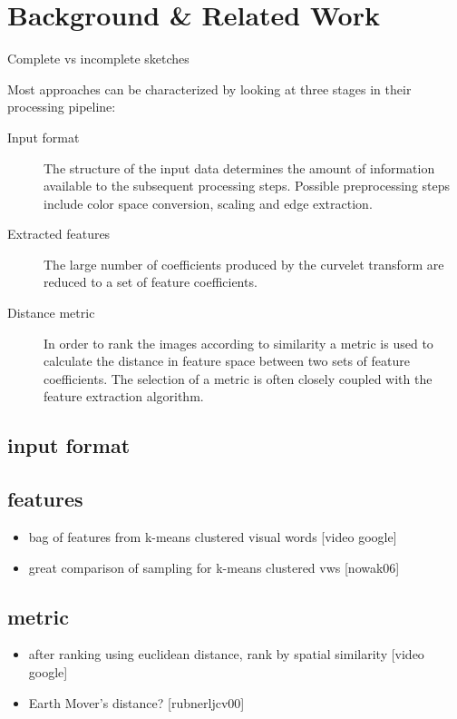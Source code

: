 \chapter{Background \& Related Work}\label{ch:background}
Complete vs incomplete sketches

Most approaches can be characterized by looking at three stages in their processing pipeline:

\begin{description}
    \item[Input format] The structure of the input data determines the amount of information available to the subsequent processing steps. Possible preprocessing steps include color space conversion, scaling and edge extraction.
    \item[Extracted features] The large number of coefficients produced by the curvelet transform are reduced to a set of feature coefficients.
    \item[Distance metric] In order to rank the images according to similarity a metric is used to calculate the distance in feature space between two sets of feature coefficients. The selection of a metric is often closely coupled with the feature extraction algorithm.
\end{description}

\section{input format}

\section{features}

\begin{itemize}
    \item bag of features from k-means clustered visual words [video google]
    \item great comparison of sampling for k-means clustered vws [nowak06]
\end{itemize}

\section{metric}

\begin{itemize}
    \item after ranking using euclidean distance, rank by spatial similarity [video google]
    \item Earth Mover's distance? [rubnerljcv00]
\end{itemize}
